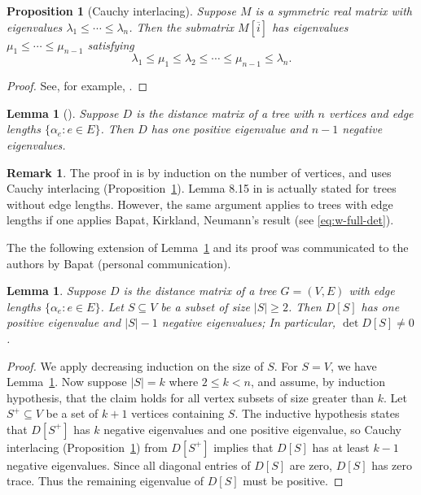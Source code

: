 \documentclass[12pt]{amsart}
\newtheorem{prop}[thm]{Proposition}
\newtheorem{lem}[thm]{Lemma}
\theoremstyle{definition}
\newtheorem{rmk}[thm]{Remark}
\newcommand{\Da}{{D}}
\begin{document}
\begin{prop}[Cauchy interlacing]
\label{prop:cauchy-interlacing}
Suppose $M$ is a symmetric real matrix  with eigenvalues $\lambda_1 \leq \cdots \leq \lambda_n$. 
Then the submatrix $M[\overline{i}]$ has eigenvalues $\mu_1 \leq \cdots \leq \mu_{n-1}$ satisfying
\[
	\lambda_1 \leq \mu_1 \leq \lambda_2 \leq \cdots \leq \mu_{n-1} \leq \lambda_n.
\]
\end{prop}
\begin{proof}
See, for example, \cite[Theorem 4.3.17]{horn-johnson}.
\end{proof}

\begin{lem}[{\cite[Lemma 8.15]{bapat-book}}]
\label{lem:dist-signature}
Suppose $\Da$ is the distance matrix of a tree with $n$ vertices and edge lengths $\{\alpha_e \colon e \in E\}$. 
Then $\Da$ has one positive eigenvalue and $n - 1$ negative eigenvalues.
\end{lem}
\begin{rmk}
The proof in \cite{bapat-book} is by induction on the number of vertices, and uses Cauchy interlacing (Proposition~\ref{prop:cauchy-interlacing}). Lemma 8.15 in \cite{bapat-book} is actually stated for trees without edge lengths. However, the same argument applies to trees with edge lengths if one applies Bapat, Kirkland, Neumann's result \cite[Corollary 2.5]{bapat-kirkland-neumann} (see \eqref{eq:w-full-det}). 
\end{rmk}
The the following extension of Lemma~\ref{lem:dist-signature} and its proof was communicated to the authors by Bapat (personal communication).
\begin{lem}
\label{lem:distance-sub-nonsingular}
Suppose $\Da$ is the distance matrix of a tree $G = (V,E)$ with edge lengths $\{\alpha_e \colon e \in E\}$. Let $S \subseteq V$ be a subset of size $|S| \geq 2$. 
Then
$\Da[S]$ has one positive eigenvalue and $|S| - 1$ negative eigenvalues;
In particular, $\det \Da[S] \neq 0$.
\end{lem}
\begin{proof}
We apply decreasing induction on the size of $S$. 
For $S = V$, we have Lemma~\ref{lem:dist-signature}.
Now suppose $|S| = k$ where $2 \leq k < n$, and assume, by induction hypothesis, 
that the claim holds for all vertex subsets of size greater than $k$.
Let $S^+ \subseteq V$ be a set of $k + 1$ vertices containing $S$.
The inductive hypothesis states that $D[S^+]$ has $k$ negative eigenvalues and one positive eigenvalue,
so Cauchy interlacing (Proposition~\ref{prop:cauchy-interlacing}) from $D[S^+]$ implies that $D[S]$ has at least $k - 1$ negative eigenvalues. 
Since all diagonal entries of $D[S]$ are zero, $D[S]$ has zero trace. 
Thus the remaining eigenvalue of $D[S]$ must be positive.
\end{proof}
\end{document}
